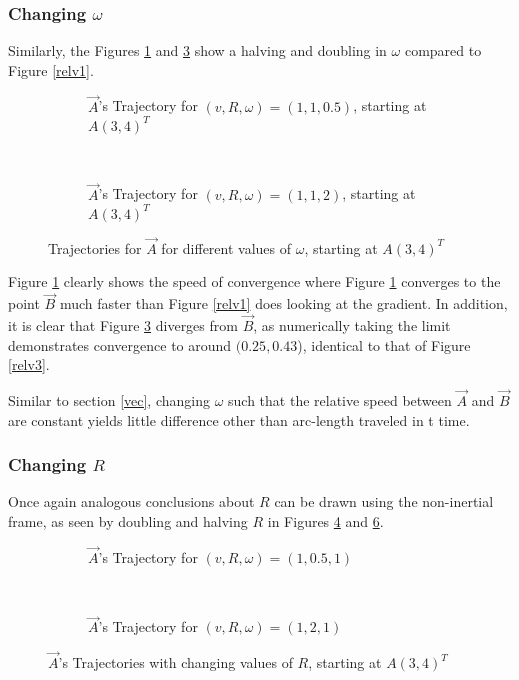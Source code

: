 \documentclass[pstricks, border=12pt]{article}
\begin{document}
\subsubsection{Changing $\omega$}
Similarly, the Figures \ref{relv4} and \ref{relva} show a halving and doubling in $\omega$ compared to Figure \ref{relv1}.

 \begin{figure}[tbh]
    \centering
    \begin{subfigure}[t]{0.5\linewidth}
         \centering
         
         \caption{$\vec A$'s Trajectory for $(v, R, \omega) = (1, 1, 0.5)$, starting at $A(3, 4)^T$}
         \label{relv4}
    \end{subfigure}%
    ~ 
    \begin{subfigure}[t]{0.5\linewidth}
         \centering
         
         \caption{$\vec A$'s Trajectory for $(v, R, \omega) = (1, 1, 2)$, starting at $A(3, 4)^T$}
         \label{relva}
    \end{subfigure}
    \caption{Trajectories for $\vec A$ for different values of $\omega$, starting at $A(3, 4)^T$}
\end{figure}

Figure \ref{relv4} clearly shows the speed of convergence where Figure \ref{relv4} converges to the point $\Vec{B}$ much faster than Figure \ref{relv1} does looking at the gradient. In addition, it is clear that Figure \ref{relva} diverges from $\vec B$, as numerically taking the limit demonstrates convergence to around $(0.25, 0.43$), identical to that of Figure \ref{relv3}.

Similar to section \ref{vec}, changing $\omega$ such that the relative speed between $\vec A$ and $\vec B$ are constant yields little difference other than arc-length traveled in t time.

\subsubsection{Changing $R$}
Once again analogous conclusions about $R$ can be drawn using the non-inertial frame, as seen by doubling and halving $R$ in Figures \ref{relv6} and \ref{relv5}.

 \begin{figure}[tbh]
    \centering
        \begin{subfigure}[t]{0.5\linewidth}
         \centering
         
         \caption{$\vec A$'s Trajectory for $(v, R, \omega) = (1, 0.5, 1)$}
         \label{relv6}
    \end{subfigure}%
    ~
    \begin{subfigure}[t]{0.5\linewidth}
         \centering
         
         \caption{$\vec A$'s Trajectory for $(v, R, \omega) = (1, 2, 1)$}
         \label{relv5}
    \end{subfigure}
    \caption{$\vec A$'s Trajectories with changing values of $R$, starting at $A(3, 4)^T$}
\end{figure}
\end{document}
